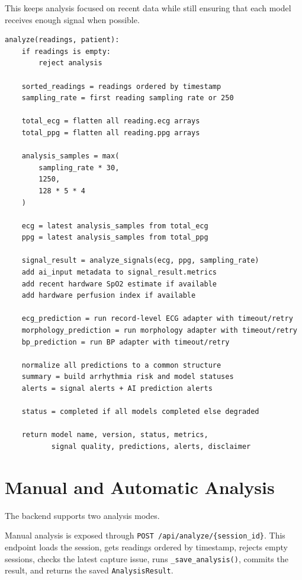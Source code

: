 This keeps analysis focused on recent data while still ensuring that each model receives enough signal when possible.

\begin{lstlisting}[caption={Pseudocode for the complete backend AI analysis}]
analyze(readings, patient):
    if readings is empty:
        reject analysis

    sorted_readings = readings ordered by timestamp
    sampling_rate = first reading sampling rate or 250

    total_ecg = flatten all reading.ecg arrays
    total_ppg = flatten all reading.ppg arrays

    analysis_samples = max(
        sampling_rate * 30,
        1250,
        128 * 5 * 4
    )

    ecg = latest analysis_samples from total_ecg
    ppg = latest analysis_samples from total_ppg

    signal_result = analyze_signals(ecg, ppg, sampling_rate)
    add ai_input metadata to signal_result.metrics
    add recent hardware SpO2 estimate if available
    add hardware perfusion index if available

    ecg_prediction = run record-level ECG adapter with timeout/retry
    morphology_prediction = run morphology adapter with timeout/retry
    bp_prediction = run BP adapter with timeout/retry

    normalize all predictions to a common structure
    summary = build arrhythmia risk and model statuses
    alerts = signal alerts + AI prediction alerts

    status = completed if all models completed else degraded

    return model name, version, status, metrics,
           signal quality, predictions, alerts, disclaimer
\end{lstlisting}

\section{Manual and Automatic Analysis}

The backend supports two analysis modes.

Manual analysis is exposed through \texttt{POST /api/analyze/\{session\_id\}}. This endpoint loads the session, gets readings ordered by timestamp, rejects empty sessions, checks the latest capture issue, runs \texttt{\_save\_analysis()}, commits the result, and returns the saved \texttt{AnalysisResult}.

